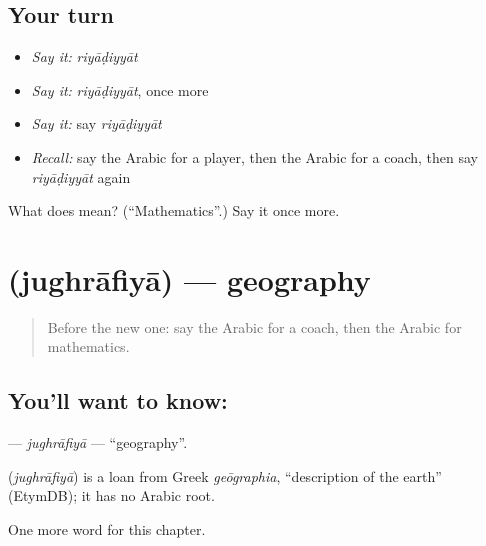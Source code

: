 \subsection*{Your turn}
\begin{itemize}
\raggedright
  \item \emph{Say it:} \emph{riyāḍiyyāt}
  \item \emph{Say it:} \emph{riyāḍiyyāt}, once more
  \item \emph{Say it:} say \emph{riyāḍiyyāt}
  \item \emph{Recall:} say the Arabic for a player, then the Arabic for a coach, then say \emph{riyāḍiyyāt} again
\end{itemize}

\begin{tcolorbox}[breakable,colback=teal!4,colframe=teal!35!black,title={Before you move on}]
What does  mean? (\textquotedblleft{}Mathematics\textquotedblright{}.) Say it once more.
\end{tcolorbox}
\section[\texorpdfstring{\ar{جغرافيا} (jughrāfiyā)}{جغرافيا (jughrāfiyā)}]{ (jughrāfiyā) — geography}

\label{lesson:AR-C190-jughrafiya}



\begin{quote}
Before the new one: say the Arabic for a coach, then the Arabic for mathematics.
\end{quote}

\subsection*{You'll want to know: }
\textbf{} — \emph{jughrāfiyā} — \textquotedblleft{}geography\textquotedblright{}.

\begin{cousinweb}
\textbf{} (\emph{jughrāfiyā}) is a loan from Greek \emph{geōgraphia}, \textquotedblleft{}description of the earth\textquotedblright{} (EtymDB); it has no Arabic root.
\end{cousinweb}

\begin{grammarlens}[title={What you've built}]
One more word for this chapter.
\end{grammarlens}

